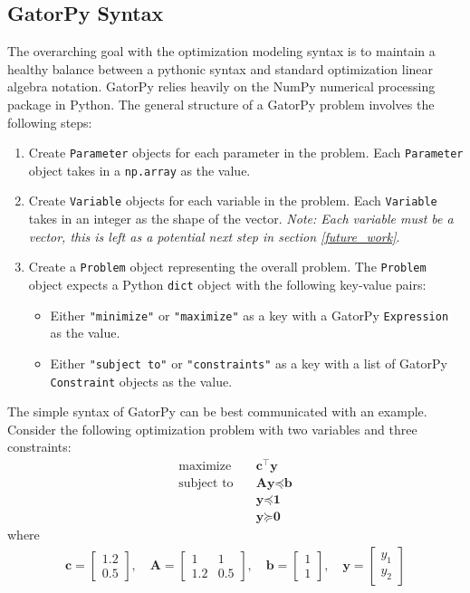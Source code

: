 \documentclass[conference]{IEEEtran}
\begin{document}
\subsection{GatorPy Syntax}
\label{Syntax}
The overarching goal with the optimization modeling syntax is to maintain a healthy balance between a pythonic syntax and standard optimization linear algebra notation.
GatorPy relies heavily on the NumPy numerical processing package in Python.
The general structure of a GatorPy problem involves the following steps:
\begin{enumerate}
    \item Create \texttt{Parameter} objects for each parameter in the problem.
    Each \texttt{Parameter} object takes in a \texttt{np.array} as the value.
    \item Create \texttt{Variable} objects for each variable in the problem.
    Each \texttt{Variable} takes in an integer as the shape of the vector.
    \textit{Note: Each variable must be a vector, this is left as a potential next step in section \ref{future_work}}.
    \item Create a \texttt{Problem} object representing the overall problem.
    The \texttt{Problem} object expects a Python \texttt{dict} object with the following key-value pairs:
    \begin{itemize}
        \item Either \texttt{"minimize"} or \texttt{"maximize"} as a key with a GatorPy \texttt{Expression} as the value.
        \item Either \texttt{"subject to"} or \texttt{"constraints"} as a key with a list of GatorPy \texttt{Constraint} objects as the value.
    \end{itemize}
\end{enumerate}
The simple syntax of GatorPy can be best communicated with an example.
Consider the following optimization problem with two variables and three constraints:
\begin{align*}
  \text{maximize} & \quad \textbf{c}^\top \textbf{y} \\
  \text{subject to} & \quad \textbf{A} \textbf{y} \preceq \textbf{b} \\
  & \quad \textbf{y} \preceq \textbf{1} \\
  & \quad \textbf{y} \succeq \textbf{0}
\end{align*}
where
\begin{align*}
    \textbf{c} = \begin{bmatrix} 1.2 \\ 0.5 \end{bmatrix}, \quad
    \textbf{A} = \begin{bmatrix} 1 & 1 \\ 1.2 & 0.5 \end{bmatrix}, \quad
    \textbf{b} = \begin{bmatrix} 1 \\ 1 \end{bmatrix}, \quad
    \textbf{y} = \begin{bmatrix} y_1 \\ y_2  \end{bmatrix}
\end{align*}
\end{document}
